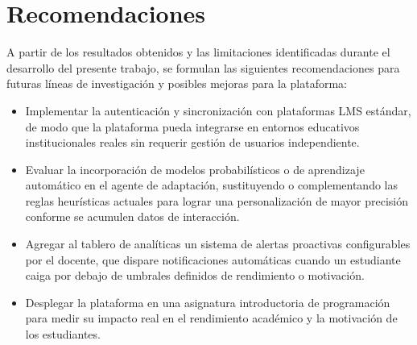 \chapter*{Recomendaciones}

A partir de los resultados obtenidos y las limitaciones identificadas durante el 
desarrollo del presente trabajo, se formulan las siguientes recomendaciones para 
futuras líneas de investigación y posibles mejoras para la plataforma:

\begin{itemize}
	
	\item Implementar la autenticación y sincronización con plataformas LMS 
	estándar, de modo que la plataforma pueda integrarse en entornos educativos 
	institucionales reales sin requerir gestión de usuarios independiente.
	
	\item Evaluar la incorporación de modelos probabilísticos o de aprendizaje 
	automático en el agente de adaptación, sustituyendo o complementando las 
	reglas heurísticas actuales para lograr una personalización de mayor precisión 
	conforme se acumulen datos de interacción.
		
	\item Agregar al tablero de analíticas un sistema de alertas proactivas 
	configurables por el docente, que dispare notificaciones automáticas cuando un 
	estudiante caiga por debajo de umbrales definidos de rendimiento o motivación.
	
	\item Desplegar la plataforma en una asignatura introductoria de programación para medir su impacto real en el rendimiento académico y la motivación de los estudiantes.
	
\end{itemize}